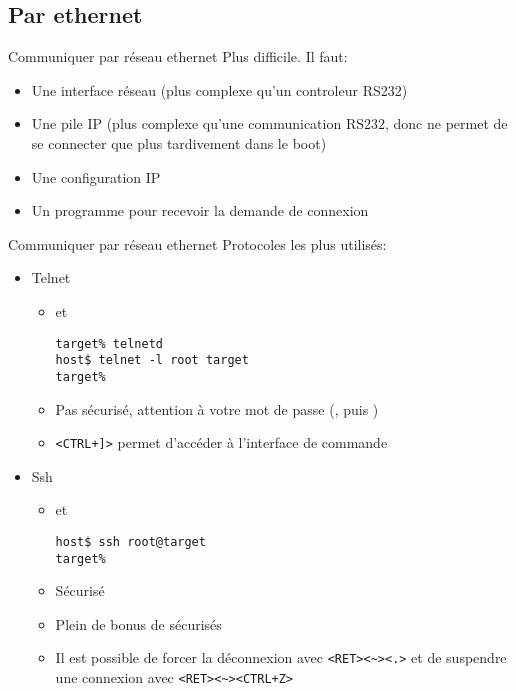 \subsection{Par ethernet}

\begin{frame}[fragile=singleslide]{Communiquer par réseau ethernet}
  Plus difficile. Il faut:
  \begin{itemize}
  \item Une interface réseau (plus complexe qu'un controleur RS232)
  \item Une pile IP (plus complexe qu'une communication RS232, donc ne
    permet de se connecter que plus tardivement dans le boot)
  \item Une configuration IP
  \item Un programme  pour recevoir la demande de connexion
  \end{itemize}
\end{frame}

\begin{frame}[fragile=singleslide]{Communiquer par réseau ethernet}
  Protocoles les plus utilisés:
  \begin{itemize}
  \item Telnet
    \begin{itemize}
    \item {} et 
      \begin{lstlisting}
target% telnetd
host$ telnet -l root target
target%
      \end{lstlisting} %
    \item   Pas   sécurisé,   attention   à   votre   mot   de   passe
      (, puis )
    \item \verb/<CTRL+]>/ permet d'accéder à l'interface de commande
    \end{itemize}
  \item Ssh
    \begin{itemize}
    \item {} et 
\begin{lstlisting}
host$ ssh root@target
target%
\end{lstlisting} %
    \item Sécurisé
    \item Plein de bonus de sécurisés
    \item   Il   est   possible   de  forcer   la   déconnexion   avec
      \verb/<RET><~><.>/   et   de   suspendre  une   connexion   avec
      \verb/<RET><~><CTRL+Z>/
    \end{itemize}
  \end{itemize}
\end{frame}

